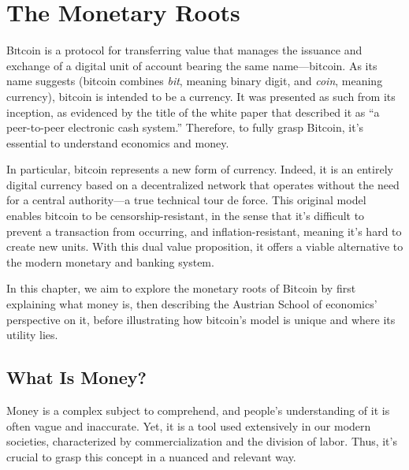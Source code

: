 \documentclass[
  a5paper,
  smalldemyvopaper,10pt,twoside,onecolumn,openright,extrafontsizes,hidelinks]{memoir}
\begin{document}

\chapter{The Monetary Roots}\label{ch:monnaie}

\label{enotezch:3}{}

{B}\textsc{i}tcoin is a protocol for transferring value that manages the
issuance and exchange of a digital unit of account bearing the same
name---bitcoin. As its name suggests (bitcoin combines \emph{bit},
meaning binary digit, and \emph{coin}, meaning currency), bitcoin is
intended to be a currency. It was presented as such from its inception,
as evidenced by the title of the white paper that described it as ``a
peer-to-peer electronic cash system.'' Therefore, to fully grasp
Bitcoin, it's essential to understand economics and money.

In particular, bitcoin represents a new form of currency. Indeed, it is
an entirely digital currency based on a decentralized network that
operates without the need for a central authority---a true technical
tour de force. This original model enables bitcoin to be
censorship-resistant, in the sense that it's difficult to prevent a
transaction from occurring, and inflation-resistant, meaning it's hard
to create new units. With this dual value proposition, it offers a
viable alternative to the modern monetary and banking system.

In this chapter, we aim to explore the monetary roots of Bitcoin by
first explaining what money is, then describing the Austrian School of
economics' perspective on it, before illustrating how bitcoin's model is
unique and where its utility lies.

\section*{What Is Money?}\label{quest-ce-que-la-monnaie}


Money is a complex subject to comprehend, and people's understanding of
it is often vague and inaccurate. Yet, it is a tool used extensively in
our modern societies, characterized by commercialization and the
division of labor. Thus, it's crucial to grasp this concept in a nuanced
and relevant way.
\end{document}
